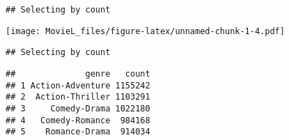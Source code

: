 \documentclass[
]{article}
\newenvironment{Shaded}{\begin{snugshade}}{\end{snugshade}}
\newcommand{\CommentTok}[1]{\textcolor[rgb]{0.56,0.35,0.01}{\textit{#1}}}
\newcommand{\DataTypeTok}[1]{\textcolor[rgb]{0.13,0.29,0.53}{#1}}
\newcommand{\DecValTok}[1]{\textcolor[rgb]{0.00,0.00,0.81}{#1}}
\newcommand{\KeywordTok}[1]{\textcolor[rgb]{0.13,0.29,0.53}{\textbf{#1}}}
\newcommand{\NormalTok}[1]{#1}
\newcommand{\OperatorTok}[1]{\textcolor[rgb]{0.81,0.36,0.00}{\textbf{#1}}}
\newcommand{\StringTok}[1]{\textcolor[rgb]{0.31,0.60,0.02}{#1}}
\begin{document}
\begin{Shaded}
\end{Shaded}

\begin{verbatim}
## Selecting by count
\end{verbatim}

\texttt{[image: MovieL\_files/figure-latex/unnamed-chunk-1-4.pdf]}

\begin{Shaded}
\end{Shaded}

\begin{verbatim}
## Selecting by count
\end{verbatim}

\begin{verbatim}
##              genre   count
## 1 Action-Adventure 1155242
## 2  Action-Thriller 1103291
## 3     Comedy-Drama 1022180
## 4   Comedy-Romance  984168
## 5    Romance-Drama  914034
\end{verbatim}
\end{document}
